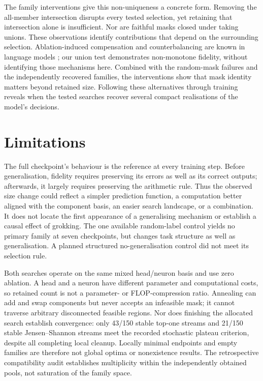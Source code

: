 The family interventions give this non-uniqueness a concrete form. Removing the all-member intersection disrupts every tested selection, yet retaining that intersection alone is insufficient. Nor are faithful masks closed under taking unions. These observations identify contributions that depend on the surrounding selection. Ablation-induced compensation and counterbalancing are known in language models \citep{mcgrath2023hydra}; our union test demonstrates non-monotone fidelity, without identifying those mechanisms here. Combined with the random-mask failures and the independently recovered families, the interventions show that mask identity matters beyond retained size. Following these alternatives through training reveals when the tested searches recover several compact realisations of the model's decisions.

\section{Limitations}

The full checkpoint's behaviour is the reference at every training step. Before generalisation, fidelity requires preserving its errors as well as its correct outputs; afterwards, it largely requires preserving the arithmetic rule. Thus the observed size change could reflect a simpler prediction function, a computation better aligned with the component basis, an easier search landscape, or a combination. It does not locate the first appearance of a generalising mechanism or establish a causal effect of grokking. The one available random-label control yields no primary family at seven checkpoints, but changes task structure as well as generalisation. A planned structured no-generalisation control did not meet its selection rule.

Both searches operate on the same mixed head/neuron basis and use zero ablation. A head and a neuron have different parameter and computational costs, so retained count is not a parameter- or FLOP-compression ratio. Annealing can add and swap components but never accepts an infeasible mask; it cannot traverse arbitrary disconnected feasible regions. Nor does finishing the allocated search establish convergence: only 43/150 stable top-one streams and 21/150 stable Jensen--Shannon streams meet the recorded stochastic plateau criterion, despite all completing local cleanup. Locally minimal endpoints and empty families are therefore not global optima or nonexistence results. The retrospective compatibility audit establishes multiplicity within the independently obtained pools, not saturation of the family space.


